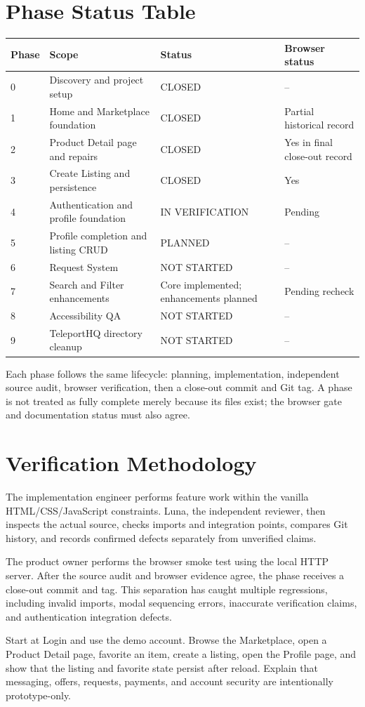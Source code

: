 \documentclass[10pt]{article}
\begin{document}
\clearpage
\section{Phase Status Table}
\begin{tabular}{@{}p{0.8cm}p{4.0cm}p{4.0cm}p{3.0cm}@{}}
\toprule
\textbf{Phase} & \textbf{Scope} & \textbf{Status} & \textbf{Browser status} \\
\midrule
0 & Discovery and project setup & CLOSED & -- \\
1 & Home and Marketplace foundation & CLOSED & Partial historical record \\
2 & Product Detail page and repairs & CLOSED & Yes in final close-out record \\
3 & Create Listing and persistence & CLOSED & Yes \\
4 & Authentication and profile foundation & IN VERIFICATION & Pending \\
5 & Profile completion and listing CRUD & PLANNED & -- \\
6 & Request System & NOT STARTED & -- \\
7 & Search and Filter enhancements & Core implemented; enhancements planned & Pending recheck \\
8 & Accessibility QA & NOT STARTED & -- \\
9 & TeleportHQ directory cleanup & NOT STARTED & -- \\
\bottomrule
\end{tabular}

Each phase follows the same lifecycle: planning, implementation, independent source audit, browser verification, then a close-out commit and Git tag. A phase is not treated as fully complete merely because its files exist; the browser gate and documentation status must also agree.

\section{Verification Methodology}
The implementation engineer performs feature work within the vanilla HTML/CSS/JavaScript constraints. Luna, the independent reviewer, then inspects the actual source, checks imports and integration points, compares Git history, and records confirmed defects separately from unverified claims.

The product owner performs the browser smoke test using the local HTTP server. After the source audit and browser evidence agree, the phase receives a close-out commit and tag. This separation has caught multiple regressions, including invalid imports, modal sequencing errors, inaccurate verification claims, and authentication integration defects.

\begin{tcolorbox}[colback=lavender,colframe=violet,title=Recommended Classroom Demo Path,fonttitle=\bfseries,coltitle=darktext,boxrule=0.8pt]
\small
Start at Login and use the demo account. Browse the Marketplace, open a Product Detail page, favorite an item, create a listing, open the Profile page, and show that the listing and favorite state persist after reload. Explain that messaging, offers, requests, payments, and account security are intentionally prototype-only.
\end{tcolorbox}
\end{document}
